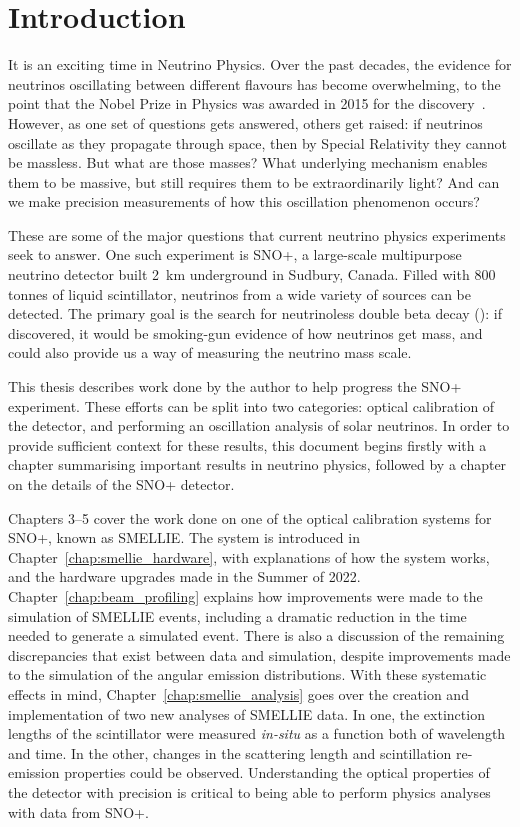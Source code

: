\chapter*{Introduction}\label{chap:intro}
It is an exciting time in Neutrino Physics. Over the past decades, the evidence for neutrinos oscillating between different flavours has become overwhelming, to the point that the Nobel Prize in Physics was awarded in 2015 for the discovery~\cite{NobelPrizePhysics2015}. However, as one set of questions gets answered, others get raised: if neutrinos oscillate as they propagate through space, then by Special Relativity they cannot be massless. But what are those masses? What underlying mechanism enables them to be massive, but still requires them to be extraordinarily light? And can we make precision measurements of how this oscillation phenomenon occurs?

These are some of the major questions that current neutrino physics experiments seek to answer. One such experiment is SNO+, a large-scale multipurpose neutrino detector built \SI{2}{\km} underground in Sudbury, Canada. Filled with 800 tonnes of liquid scintillator, neutrinos from a wide variety of sources can be detected. The primary goal is the search for neutrinoless double beta decay (\onbb{}): if discovered, it would be smoking-gun evidence of how neutrinos get mass, and could also provide us a way of measuring the neutrino mass scale.

This thesis describes work done by the author to help progress the SNO+ experiment. These efforts can be split into two categories: optical calibration of the detector, and performing an oscillation analysis of solar neutrinos. In order to provide sufficient context for these results, this document begins firstly with a chapter summarising important results in neutrino physics, followed by a chapter on the details of the SNO+ detector.

Chapters 3--5 cover the work done on one of the optical calibration systems for SNO+, known as SMELLIE. The system is introduced in Chapter~\ref{chap:smellie_hardware}, with explanations of how the system works, and the hardware upgrades made in the Summer of 2022. Chapter~\ref{chap:beam_profiling} explains how improvements were made to the simulation of SMELLIE events, including a dramatic reduction in the time needed to generate a simulated event. There is also a discussion of the remaining discrepancies that exist between data and simulation, despite improvements made to the simulation of the angular emission distributions. With these systematic effects in mind, Chapter~\ref{chap:smellie_analysis} goes over the creation and implementation of two new analyses of SMELLIE data. In one, the extinction lengths of the scintillator were measured \textit{in-situ} as a function both of wavelength and time. In the other, changes in the scattering length and scintillation re-emission properties could be observed. Understanding the optical properties of the detector with precision is critical to being able to perform physics analyses with data from SNO+.

